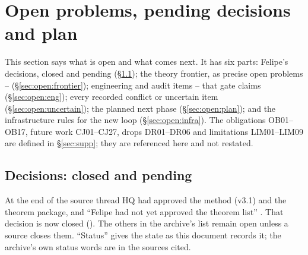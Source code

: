 \section{Open problems, pending decisions and plan}\label{sec:open}

This section says what is open and what comes next. It has six parts: Felipe's decisions, closed and pending (\S\ref{sec:open:decisions}); the theory frontier, as precise open problems -- (\S\ref{sec:open:frontier}); engineering and audit items -- that gate claims (\S\ref{sec:open:eng}); every recorded conflict or uncertain item (\S\ref{sec:open:uncertain}); the planned next phase (\S\ref{sec:open:plan}); and the infrastructure rules for the new loop (\S\ref{sec:open:infra}). The obligations OB01--OB17, future work CJ01--CJ27, drops DR01--DR06 and limitations LIM01--LIM09 are defined in \S\ref{sec:supp}; they are referenced here and not restated.

\subsection{Decisions: closed and pending}\label{sec:open:decisions}

At the end of the source thread HQ had approved the method (v3.1) and the theorem package, and ``Felipe had not yet approved the theorem list'' . That decision is now closed (). The others in the archive's list  remain open unless a source closes them. ``Status'' gives the state as this document records it; the archive's own status words are in the sources cited.

